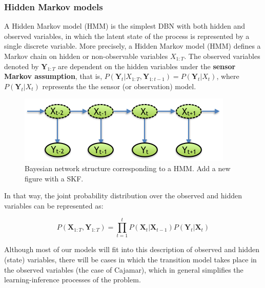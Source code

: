 \subsubsection{Hidden Markov models}
A Hidden Markov model (HMM) is the simplest DBN with both hidden and observed variables, in which the latent state of the process is represented by a single discrete variable. More precisely, a Hidden Markov model (HMM) defines a Markov chain on hidden or non-observable variables $X_{1:T}$. The observed variables denoted by $\bm Y_{1:T}$ are dependent on the hidden variables under the \textbf{sensor Markov assumption}, that is, $P(\bm Y_t| X_{1:T}, \bm Y_{1:t-1}) = P(\bm Y_t| X_t)$, where $P(\bm Y_t| X_t)$ represents the the sensor (or observation) model.  

\begin{figure}[ht!]
\begin{center}
\includegraphics[scale=0.56]{./figures/PreliminariesHMM}
\caption{\label{Figure:HMM}Bayesian network structure corresponding to a HMM. {\color{red} Add a new figure with a SKF.}}
\end{center}
\end{figure}


In that way, the joint probability distribution over the observed and hidden variables can be represented as:

\begin{equation}
P(\bm X_{1:T},\bm Y_{1:T}) = \prod_{t=1}^t{P(\bm X_t| \bm X_{t-1})P(\bm Y_t|\bm X_t)}
\end{equation}

Although most of our models will fit into this description of observed and hidden (state) variables, there will be cases in which the transition model takes place in the observed variables (the case of Cajamar), which in general simplifies the learning-inference processes of the problem.


